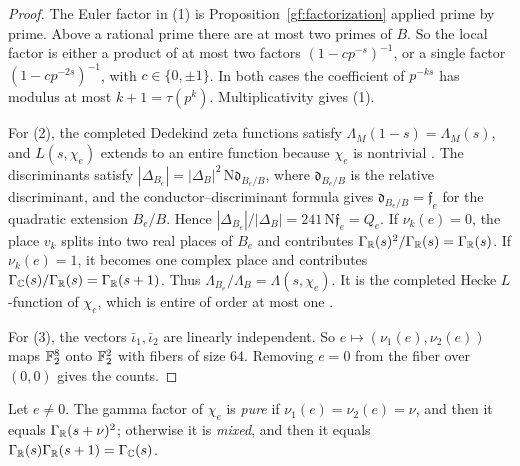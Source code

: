 \begin{proof}
The Euler factor in (1) is Proposition~\ref{gf:factorization} applied prime
by prime. Above a rational prime there are at most two primes of $B$. So
the local factor is either a product of at most two factors
$(1-cp^{-s})^{-1}$, or a single factor $(1-cp^{-2s})^{-1}$, with
$c\in\{0,\pm1\}$. In both cases the coefficient of $p^{-ks}$ has modulus at
most $k+1=\tau(p^k)$. Multiplicativity gives (1).

For (2), the completed Dedekind zeta functions satisfy
$\Lambda_M(1-s)=\Lambda_M(s)$, and $L(s,\chi_e)$ extends to an entire
function because $\chi_e$ is nontrivial \cite{Hecke1920,Tate1967}. The
discriminants satisfy
$|\Delta_{B_e}|=|\Delta_B|^2\,\mathrm N\mathfrak d_{B_e/B}$, where
$\mathfrak d_{B_e/B}$ is the relative discriminant, and the
conductor--discriminant formula gives $\mathfrak d_{B_e/B}=\mathfrak f_e$
for the quadratic extension $B_e/B$. Hence
$|\Delta_{B_e}|/|\Delta_B|=241\,\mathrm N\mathfrak f_e=Q_e$. If $\nu_k(e)=0$,
the place $v_k$ splits into two real places of $B_e$ and contributes
$\Gamma_\mathbb R(s)^2/\Gamma_\mathbb R(s)=\Gamma_\mathbb R(s)$. If $\nu_k(e)=1$, it becomes one
complex place and contributes $\Gamma_\mathbb C(s)/\Gamma_\mathbb R(s)=\Gamma_\mathbb R(s+1)$.
Thus $\Lambda_{B_e}/\Lambda_B=\Lambda(s,\chi_e)$. It is the completed Hecke
$L$-function of $\chi_e$, which is entire of order at most one
\cite{Hecke1920,Tate1967}.

For (3), the vectors $\bar\iota_1,\bar\iota_2$ are linearly independent. So
$e\mapsto(\nu_1(e),\nu_2(e))$ maps $\mathbb F_2^8$ onto $\mathbb F_2^2$ with fibers of
size $64$. Removing $e=0$ from the fiber over $(0,0)$ gives the counts.
\end{proof}

\begin{definition}\label{gf:pure-mixed}
Let $e\ne0$. The gamma factor of $\chi_e$ is \emph{pure} if
$\nu_1(e)=\nu_2(e)=\nu$, and then it equals $\Gamma_\mathbb R(s+\nu)^2$; otherwise it
is \emph{mixed}, and then it equals $\Gamma_\mathbb R(s)\Gamma_\mathbb R(s+1)=\Gamma_\mathbb C(s)$.
\end{definition}

